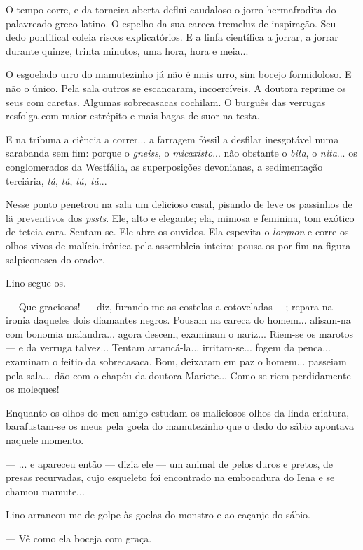 O tempo corre, e da torneira aberta deflui caudaloso o jorro
hermafrodita do palavreado greco-latino. O espelho da sua careca
tremeluz de inspiração. Seu dedo pontifical coleia riscos explicatórios.
E a linfa científica a jorrar, a jorrar durante quinze, trinta minutos,
uma hora, hora e meia...

O esgoelado urro do mamutezinho já não é mais urro, sim bocejo
formidoloso. E não o único. Pela sala outros se escancaram,
incoercíveis. A doutora reprime os seus com caretas. Algumas
sobrecasacas cochilam. O burguês das verrugas resfolga com maior
estrépito e mais bagas de suor na testa.

E na tribuna a ciência a correr... a farragem fóssil a desfilar
inesgotável numa sarabanda sem fim: porque o \emph{gneiss}, o
\emph{micaxisto}... não obstante o \emph{bita}, o \emph{nita}... os
conglomerados da Westfália, as superposições devonianas, a sedimentação
terciária, \emph{tá}, \emph{tá}, \emph{tá, tá}...

Nesse ponto penetrou na sala um delicioso casal, pisando de leve os
passinhos de lã preventivos dos \emph{pssts}. Ele, alto e elegante; ela,
mimosa e feminina, tom exótico de teteia cara. Sentam-se. Ele abre os
ouvidos. Ela espevita o \emph{lorgnon} e corre os olhos vivos de malícia
irônica pela assembleia inteira: pousa-os por fim na figura salpiconesca
do orador.

Lino segue-os.

--- Que graciosos! --- diz, furando-me as costelas a cotoveladas ---;
repara na ironia daqueles dois diamantes negros. Pousam na careca do
homem... alisam-na com bonomia malandra... agora descem, examinam o
nariz... Riem-se os marotos --- e da verruga talvez... Tentam
arrancá-la... irritam-se... fogem da penca... examinam o feitio da
sobrecasaca. Bom, deixaram em paz o homem... passeiam pela sala... dão
com o chapéu da doutora Mariote... Como se riem perdidamente os
moleques!

Enquanto os olhos do meu amigo estudam os maliciosos olhos da linda
criatura, barafustam-se os meus pela goela do mamutezinho que o dedo do
sábio apontava naquele momento.

--- ... e apareceu então --- dizia ele --- um animal de pelos duros e
pretos, de presas recurvadas, cujo esqueleto foi encontrado na
embocadura do Iena e se chamou mamute...

Lino arrancou-me de golpe às goelas do monstro e ao caçanje do sábio.

--- Vê como ela boceja com graça.


